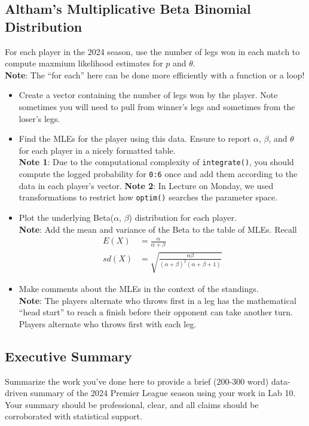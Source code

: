 \documentclass[
]{article}
\providecommand{\tightlist}{%
  \setlength{\itemsep}{0pt}\setlength{\parskip}{0pt}}
\begin{document}
\subsection{Altham's Multiplicative Beta Binomial
Distribution}\label{althams-multiplicative-beta-binomial-distribution-1}

For each player in the 2024 season, use the number of legs won in each
match to compute maxmium likelihood estimates for \(p\) and
\(\theta\).\\
\textbf{Note}: The ``for each'' here can be done more efficiently with a
function or a loop!

\begin{itemize}
\tightlist
\item
  Create a vector containing the number of legs won by the player. Note
  sometimes you will need to pull from winner's legs and sometimes from
  the loser's legs.
\item
  Find the MLEs for the player using this data. Ensure to report
  \(\alpha\), \(\beta\), and \(\theta\) for each player in a nicely
  formatted table.\\
  \textbf{Note 1}: Due to the computational complexity of
  \texttt{integrate()}, you should compute the logged probability for
  \texttt{0:6} once and add them according to the data in each player's
  vector. \textbf{Note 2}: In Lecture on Monday, we used transformations
  to restrict how \texttt{optim()} searches the parameter space.
\item
  Plot the underlying Beta(\(\alpha\), \(\beta\)) distribution for each
  player.\\
  \textbf{Note}: Add the mean and variance of the Beta to the table of
  MLEs. Recall \begin{align*}
   E(X)   &= \frac{\alpha}{\alpha+\beta}\\
   sd(X) &= \sqrt{\frac{\alpha\beta}{(\alpha+\beta)^2(\alpha+\beta+1)}}
  \end{align*}
\item
  Make comments about the MLEs in the context of the standings.\\
  \textbf{Note}: The players alternate who throws first in a leg has the
  mathematical ``head start'' to reach a finish before their opponent
  can take another turn. Players alternate who throws first with each
  leg.
\end{itemize}

\subsection{Executive Summary}\label{executive-summary}

Summarize the work you've done here to provide a brief (200-300 word)
data-driven summary of the 2024 Premier League season using your work in
Lab 10. Your summary should be professional, clear, and all claims
should be corroborated with statistical support.
\end{document}
